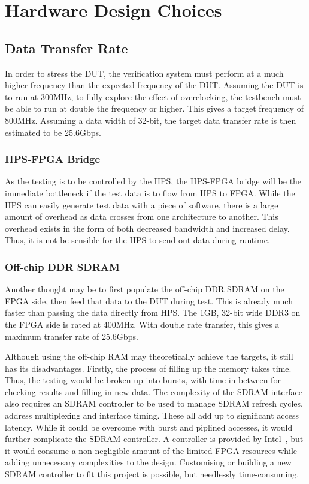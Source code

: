 \section{Hardware Design Choices}

\subsection{Data Transfer Rate}
In order to stress the DUT, the verification system must perform at a much higher frequency than the expected frequency of the DUT.
Assuming the DUT is to run at 300MHz, to fully explore the effect of overclocking, the testbench must be able to run at double the frequency or higher.
This gives a target frequency of 800MHz.
Assuming a data width of 32-bit, the target data transfer rate is then estimated to be 25.6Gbps.

\subsubsection{\textbf{HPS-FPGA Bridge}}
As the testing is to be controlled by the HPS, the HPS-FPGA bridge will be the immediate bottleneck if the test data is to flow from HPS to FPGA.
While the HPS can easily generate test data with a piece of software, there is a large amount of overhead as data crosses from one architecture to another.
This overhead exists in the form of both decreased bandwidth and increased delay.
Thus, it is not be sensible for the HPS to send out data during runtime.

\subsubsection{\textbf{Off-chip DDR SDRAM}}
Another thought may be to first populate the off-chip DDR SDRAM on the FPGA side, then feed that data to the DUT during test.
This is already much faster than passing the data directly from HPS.
The 1GB, 32-bit wide DDR3 on the FPGA side is rated at 400MHz.
With double rate transfer, this gives a maximum transfer rate of 25.6Gbps.

Although using the off-chip RAM may theoretically achieve the targets, it still has its disadvantages.
Firstly, the process of filling up the memory takes time.
Thus, the testing would be broken up into bursts, with time in between for checking results and filling in new data.
The complexity of the SDRAM interface also requires an SDRAM controller to be used to manage SDRAM refresh cycles, address multiplexing and interface timing.
These all add up to significant access latency.
While it could be overcome with burst and piplined accesses, it would further complicate the SDRAM controller.
A controller is provided by Intel~\cite{Altera3}, but it would consume a non-negligible amount of the limited FPGA resources while adding unnecessary complexities to the design.
Customising or building a new SDRAM controller to fit this project is possible, but needlessly time-consuming.

